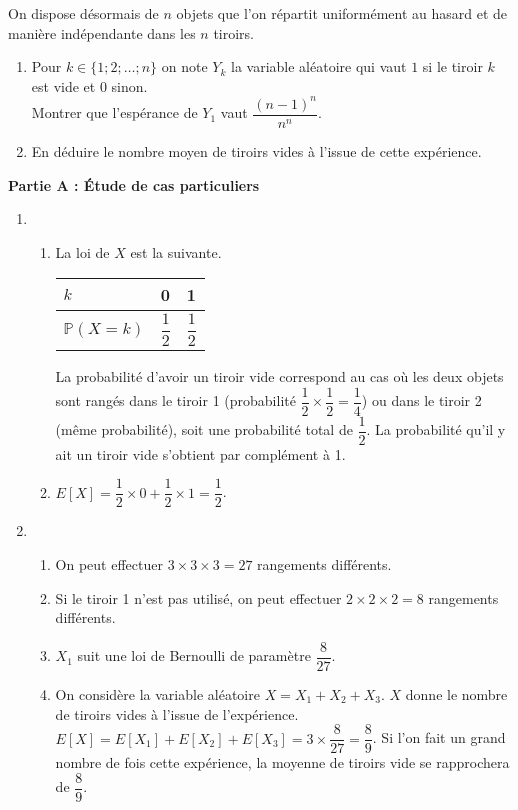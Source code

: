\documentclass[11pt,fleqn, openany]{book} %
\begin{document}
\begin{exercise}
On dispose désormais de $n$ objets que l'on répartit uniformément au hasard et de manière indépendante dans les $n$ tiroirs.
\begin{enumerate}
\item Pour $k \in \{ 1 ; 2 ; \ldots ; n\}$ on note $Y_k$ la variable aléatoire qui vaut $1$ si le tiroir $k$ est vide et 0 sinon. \\ Montrer que l'espérance de $Y_1$ vaut $\dfrac{(n-1)^n}{n^n}$.
\item En déduire le nombre moyen de tiroirs vides à l'issue de cette expérience. 
\end{enumerate}\end{exercise}


\begin{solution}
\textbf{Partie A : Étude de cas particuliers}

\begin{enumerate}
\item 

\begin{enumerate}
\item La loi de $X$ est la suivante.

\begin{tabularx}{0.5\linewidth}{|X|X|X|}
\hline
$k$ & 0 & 1 \\
\hline
$\mathbb{P}(X=k)$ & $\dfrac{1}{2}$ & $\dfrac{1}{2}$\\
\hline
\end{tabularx}

La probabilité d'avoir un tiroir vide correspond au cas où les deux objets sont rangés dans le tiroir 1 (probabilité $\dfrac{1}{2} \times \dfrac{1}{2} = \dfrac{1}{4}$) ou dans le tiroir 2 (même probabilité), soit une probabilité total de $\dfrac{1}{2}$. La probabilité qu'il y ait un tiroir vide s'obtient par complément à 1.

\item $E[X]=\dfrac{1}{2} \times 0 + \dfrac{1}{2} \times 1 = \dfrac{1}{2}$.
\end{enumerate}
\item 
\begin{enumerate}
\item On peut effectuer $3 \times 3 \times 3 = 27$ rangements différents.
\item Si le tiroir 1 n'est pas utilisé, on peut effectuer $2 \times 2 \times 2 = 8$ rangements différents.
\item $X_1$ suit une loi de Bernoulli de paramètre $\dfrac{8}{27}$.
\item On considère la variable aléatoire $X=X_1+X_2+X_3$.  $X$ donne le nombre de tiroirs vides à l'issue de l'expérience. $E[X]=E[X_1]+E[X_2]+E[X_3] = 3 \times \dfrac{8}{27}=\dfrac{8}{9}$. Si l'on fait un grand nombre de fois cette expérience, la moyenne de tiroirs vide se rapprochera de $\dfrac{8}{9}$.
\end{enumerate}
\end{enumerate}


\end{solution}
\end{document}
